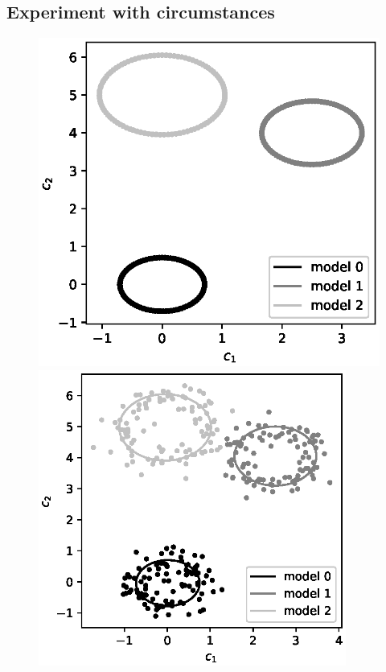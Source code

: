 \documentclass[12pt, twoside]{article}
\numberwithin{equation}{section}
\begin{document}
\subsection{ Experiment with circumstances }
\begin{figure}[h!]
\begin{minipage}{.32\textwidth}
      \includegraphics[width =  \textwidth]{figures/900.eps}
\end{minipage}
\begin{minipage}{.32\textwidth}
\hspace{2mm}
      \includegraphics[width =  0.9\textwidth]{figures/901.eps}

\end{minipage}
\end{figure}
\end{document}
